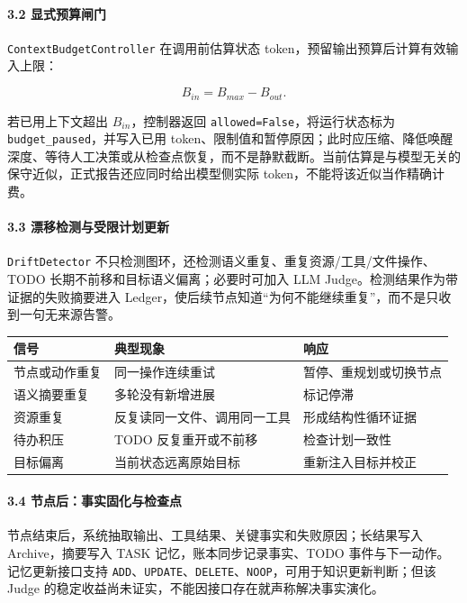\documentclass[UTF8,a4paper,12pt]{ctexart}
\begin{document}
\paragraph{3.2 显式预算闸门}

\texttt{ContextBudgetController} 在调用前估算状态 token，预留输出预算后计算有效输入上限：

\[
B_{in}=B_{max}-B_{out}.
\]

若已用上下文超出 \(B_{in}\)，控制器返回 \texttt{allowed=False}，将运行状态标为 \texttt{budget\_paused}，并写入已用 token、限制值和暂停原因；此时应压缩、降低唤醒深度、等待人工决策或从检查点恢复，而不是静默截断。当前估算是与模型无关的保守近似，正式报告还应同时给出模型侧实际 token，不能将该近似当作精确计费。

\paragraph{3.3 漂移检测与受限计划更新}

\texttt{DriftDetector} 不只检测图环，还检测语义重复、重复资源/工具/文件操作、TODO 长期不前移和目标语义偏离；必要时可加入 LLM Judge。检测结果作为带证据的失败摘要进入 Ledger，使后续节点知道``为何不能继续重复''，而不是只收到一句无来源告警。

\begin{longtable}[]{@{}lll@{}}
\toprule
信号 & 典型现象 & 响应 \\
\midrule
\endhead
节点或动作重复 & 同一操作连续重试 & 暂停、重规划或切换节点 \\
语义摘要重复 & 多轮没有新增进展 & 标记停滞 \\
资源重复 & 反复读同一文件、调用同一工具 & 形成结构性循环证据 \\
待办积压 & TODO 反复重开或不前移 & 检查计划一致性 \\
目标偏离 & 当前状态远离原始目标 & 重新注入目标并校正 \\
\bottomrule
\end{longtable}

\paragraph{3.4 节点后：事实固化与检查点}

节点结束后，系统抽取输出、工具结果、关键事实和失败原因；长结果写入 Archive，摘要写入 TASK 记忆，账本同步记录事实、TODO 事件与下一动作。记忆更新接口支持 \texttt{ADD}、\texttt{UPDATE}、\texttt{DELETE}、\texttt{NOOP}，可用于知识更新判断；但该 Judge 的稳定收益尚未证实，不能因接口存在就声称解决事实演化。
\end{document}
